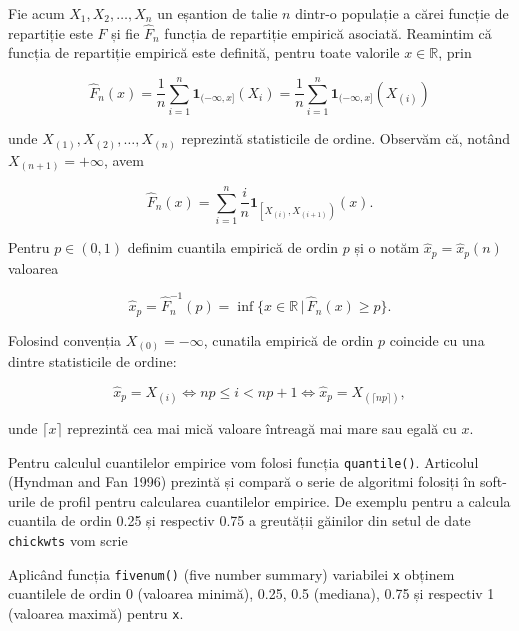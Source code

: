 \documentclass[]{article}
\newenvironment{Shaded}{\begin{snugshade}}{\end{snugshade}}
\newcommand{\KeywordTok}[1]{\textcolor[rgb]{0.13,0.29,0.53}{\textbf{#1}}}
\newcommand{\DataTypeTok}[1]{\textcolor[rgb]{0.13,0.29,0.53}{#1}}
\newcommand{\DecValTok}[1]{\textcolor[rgb]{0.00,0.00,0.81}{#1}}
\newcommand{\FloatTok}[1]{\textcolor[rgb]{0.00,0.00,0.81}{#1}}
\newcommand{\StringTok}[1]{\textcolor[rgb]{0.31,0.60,0.02}{#1}}
\newcommand{\OperatorTok}[1]{\textcolor[rgb]{0.81,0.36,0.00}{\textbf{#1}}}
\newcommand{\NormalTok}[1]{#1}
\begin{document}
Fie acum \(X_1,X_2,\ldots,X_n\) un eșantion de talie \(n\) dintr-o
populație a cărei funcție de repartiție este \(F\) și fie \(\hat{F}_n\)
funcția de repartiție empirică asociată. Reamintim că funcția de
repartiție empirică este definită, pentru toate valorile
\(x\in\mathbb{R}\), prin

\[
  \hat{F}_n(x) = \frac{1}{n}\sum_{i = 1}^{n}\mathbf{1}_{(-\infty, x]}(X_i) = \frac{1}{n}\sum_{i = 1}^{n}\mathbf{1}_{(-\infty, x]}(X_{(i)})
\]

unde \(X_{(1)}, X_{(2)}, \ldots, X_{(n)}\) reprezintă statisticile de
ordine. Observăm că, notând \(X_{(n+1)} = +\infty\), avem

\[
  \hat{F}_n(x) = \sum_{i = 1}^{n}\frac{i}{n}\mathbf{1}_{\left[X_{(i)}, X_{(i+1)}\right)}(x).
\]

Pentru \(p\in(0,1)\) definim cuantila empirică de ordin \(p\) și o notăm
\(\hat{x}_p = \hat{x}_p(n)\) valoarea

\[
  \hat{x}_p = \hat{F}_n^{-1}(p) = \inf\{x\in\mathbb{R}\,|\,\hat{F}_n(x)\geq p\}.
\]

Folosind convenția \(X_{(0)}=-\infty\), cunatila empirică de ordin \(p\)
coincide cu una dintre statisticile de ordine:

\[
  \hat{x}_p = X_{(i)} \iff np\leq i< np+1 \iff \hat{x}_p = X_{(\lceil np \rceil)},
\]

unde \(\lceil x \rceil\) reprezintă cea mai mică valoare întreagă mai
mare sau egală cu \(x\).

Pentru calculul cuantilelor empirice vom folosi funcția
\texttt{quantile()}. Articolul (Hyndman and Fan 1996) prezintă și
compară o serie de algoritmi folosiți în soft-urile de profil pentru
calcularea cuantilelor empirice. De exemplu pentru a calcula cuantila de
ordin 0.25 și respectiv 0.75 a greutății găinilor din setul de date
\texttt{chickwts} vom scrie

\begin{Shaded}
\end{Shaded}

Aplicând funcția \texttt{fivenum()} (five number summary) variabilei
\texttt{x} obținem cuantilele de ordin 0 (valoarea minimă), 0.25, 0.5
(mediana), 0.75 și respectiv 1 (valoarea maximă) pentru \texttt{x}.
\end{document}
